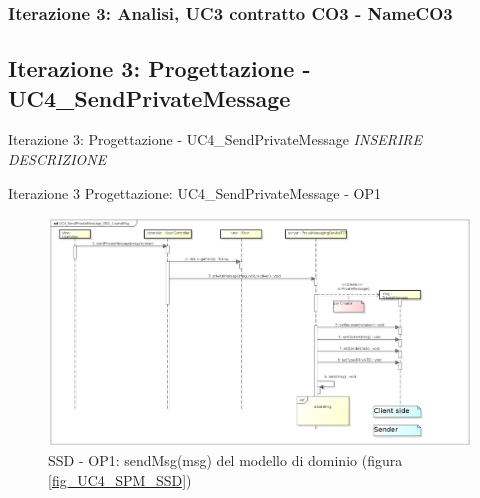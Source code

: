 \documentclass[t]{beamer} %
\begin{document}
\begin{frame}
 \frametitle{Iterazione 3: Analisi, UC3 contratto CO3 - NameCO3}
  \begin{table}[!htbp]
   \caption {UC3 Contratto CO3 - NameCO3}
    \label{table:1}
   \end{table}
\end{frame}

\subsection{Iterazione 3: Progettazione - UC4\_SendPrivateMessage}
\begin{frame} {Iterazione 3: Progettazione - UC4\_SendPrivateMessage}
  \emph{INSERIRE DESCRIZIONE}
\end{frame}

\begin{frame} {Iterazione 3 Progettazione: UC4\_SendPrivateMessage - OP1}
   \begin{figure}
     \includegraphics[scale=0.22]{image_astah/Iteration_3_DesignModel/UC4_SendPrivateMessage_SSD_1_sendMsg.png}{\centering}
     \caption{SSD - OP1: sendMsg(msg) del modello di dominio (figura \ref{fig_UC4_SPM_SSD}) }
     \label{fig_UC4_SSD_SRM_1} 
   \end{figure}
\end{frame}
\end{document}
